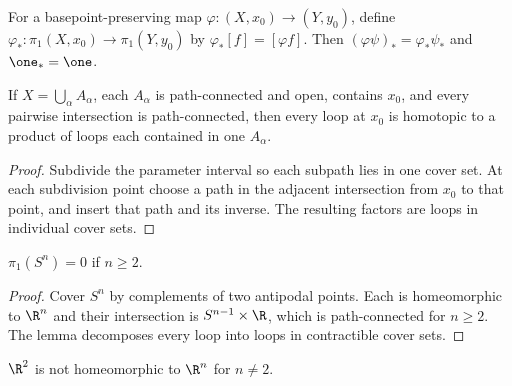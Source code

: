 \begin{definition}
\label{def:induced-homomorphism}
\leanok
{}
For a basepoint-preserving map $\varphi:(X,x_0)\to(Y,y_0)$, define
$\varphi_*:\pi_1(X,x_0)\to\pi_1(Y,y_0)$ by $\varphi_*[f]=[\varphi f]$.
Then $(\varphi\psi)_*=\varphi_*\psi_*$ and $\one_*=\one$.
\end{definition}

\begin{lemma}
\label{lem:loop-decomposition-open-cover}
\leanok
{}
If $X=\bigcup_\alpha A_\alpha$, each $A_\alpha$ is path-connected and open,
contains $x_0$, and every pairwise intersection is path-connected, then every
loop at $x_0$ is homotopic to a product of loops each contained in one
$A_\alpha$.
\end{lemma}

\begin{proof}
\leanok
\sketch Subdivide the parameter interval so each subpath lies in one cover set.
At each subdivision point choose a path in the adjacent intersection from $x_0$
to that point, and insert that path and its inverse. The resulting factors are
loops in individual cover sets.
\end{proof}

\begin{proposition}[$\pi_1(S^n) = 0$ for $n \ge 2$]
\label{prop:pi1-sphere-trivial-n-geq-2}
\leanok
{}
$\pi_1(S^n)=0$ if $n\geq2$.
\end{proposition}

\begin{proof}
\leanok
\sketch Cover $S^n$ by complements of two antipodal points. Each is
homeomorphic to $\R^n$ and their intersection is $S^{n-1}\times\R$, which is
path-connected for $n\geq2$. The lemma decomposes every loop into loops in
contractible cover sets.
\end{proof}

\begin{corollary}
\label{cor:r2-not-homeomorphic-rn}
\leanok
{}
$\R^2$ is not homeomorphic to $\R^n$ for $n\ne2$.
\end{corollary}


